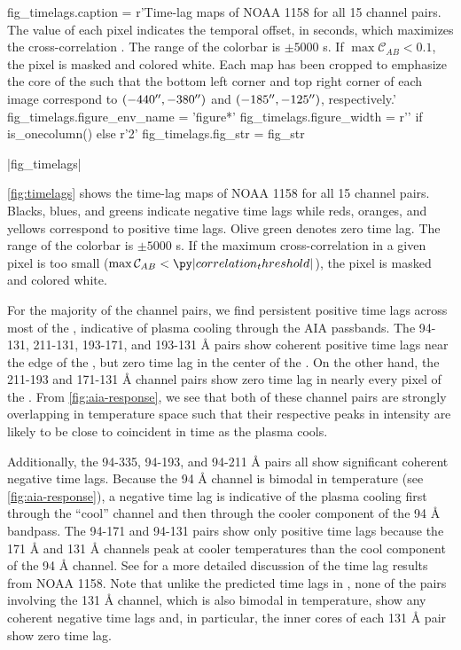 \begin{pycode}
fig_timelags.caption = r'Time-lag maps of \AR{} NOAA 1158 for all 15 channel pairs. The value of each pixel indicates the temporal offset, in seconds, which maximizes the cross-correlation . The range of the colorbar is $\pm5000$ s. If $\max\mathcal{C}_{AB}<0.1$, the pixel is masked and colored white. Each map has been cropped to emphasize the core of the \AR{} such that the bottom left corner and top right corner of each image correspond to $(-440\mbox{$^{\prime\prime}$},-380\mbox{$^{\prime\prime}$})$ and $(-185\mbox{$^{\prime\prime}$},-125\mbox{$^{\prime\prime}$})$, respectively.'
fig_timelags.figure_env_name = 'figure*'
fig_timelags.figure_width = r'\columnwidth' if is_onecolumn() else r'2\columnwidth'
fig_timelags.fig_str = fig_str
\end{pycode}
|fig_timelags|

\autoref{fig:timelags} shows the time-lag maps of \AR{} NOAA 1158 for all 15 channel pairs. Blacks, blues, and greens indicate negative time lags while reds, oranges, and yellows correspond to positive time lags. Olive green denotes zero time lag. The range of the colorbar is $\pm5000$ s. If the maximum cross-correlation in a given pixel is too small ($\max\mathcal{C}_{AB}<\py|correlation_threshold|$), the pixel is masked and colored white.

For the majority of the channel pairs, we find persistent positive time lags across most of the \AR{}, indicative of plasma cooling through the AIA passbands. The 94-131, 211-131, 193-171, and 193-131 \AA{} pairs show coherent positive time lags near the edge of the \AR{}, but zero time lag in the center of the \AR{}. On the other hand, the 211-193 and 171-131 \AA{} channel pairs show zero time lag in nearly every pixel of the \AR{}. From \autoref{fig:aia-response}, we see that both of these channel pairs are strongly overlapping in temperature space such that their respective peaks in intensity are likely to be close to coincident in time as the plasma cools. 

Additionally, the 94-335, 94-193, and 94-211 \AA{} pairs all show significant coherent negative time lags. Because the 94 \AA{} channel is bimodal in temperature (see \autoref{fig:aia-response}), a negative time lag is indicative of the plasma cooling first through the ``cool'' channel and then through the cooler component of the 94 \AA{} bandpass. The 94-171 and 94-131 pairs show only positive time lags because the 171 \AA{} and 131 \AA{} channels peak at cooler temperatures than the cool component of the 94 \AA{} channel. See \citet{viall_survey_2017} for a more detailed discussion of the time lag results from NOAA 1158. Note that unlike the predicted time lags in , none of the pairs involving the 131 \AA{} channel, which is also bimodal in temperature, show any coherent negative time lags and, in particular, the inner cores of each 131 \AA{} pair show zero time lag.

